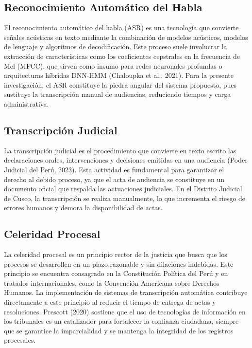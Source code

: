 \documentclass[12pt,a4paper,oneside]{report}
\begin{document}
\subsection{Reconocimiento Automático del Habla}

El reconocimiento automático del habla (ASR) es una tecnología que convierte señales acústicas en texto mediante la combinación de modelos acústicos, modelos de lenguaje y algoritmos de decodificación. Este proceso suele involucrar la extracción de características como los coeficientes cepstrales en la frecuencia de Mel (MFCC), que sirven como insumo para redes neuronales profundas o arquitecturas híbridas DNN-HMM (Chaloupka et al., 2021). Para la presente investigación, el ASR constituye la piedra angular del sistema propuesto, pues sustituye la transcripción manual de audiencias, reduciendo tiempos y carga administrativa.

\subsection{Transcripción Judicial}

La transcripción judicial es el procedimiento que convierte en texto escrito las declaraciones orales, intervenciones y decisiones emitidas en una audiencia (Poder Judicial del Perú, 2023). Esta actividad es fundamental para garantizar el derecho al debido proceso, ya que el acta de audiencia se constituye en un documento oficial que respalda las actuaciones judiciales. En el Distrito Judicial de Cusco, la transcripción se realiza manualmente, lo que incrementa el riesgo de errores humanos y demora la disponibilidad de actas.

\subsection{Celeridad Procesal}

La celeridad procesal es un principio rector de la justicia que busca que los procesos se desarrollen en un plazo razonable y sin dilaciones indebidas. Este principio se encuentra consagrado en la Constitución Política del Perú y en tratados internacionales, como la Convención Americana sobre Derechos Humanos. La implementación de sistemas de transcripción automática contribuye directamente a este principio al reducir el tiempo de entrega de actas y resoluciones. Prescott (2020) sostiene que el uso de tecnologías de información en los tribunales es un catalizador para fortalecer la confianza ciudadana, siempre que se garantice la imparcialidad y se mantenga la integridad de los registros procesales.
\end{document}
